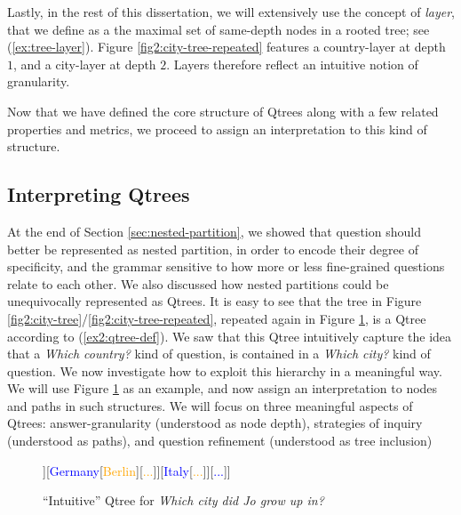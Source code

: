 Lastly, in the rest of this dissertation, we will extensively use the concept of \textit{layer}, that we define as a the maximal set of same-depth nodes in a rooted tree; see (\ref{ex:tree-layer}). Figure \ref{fig2:city-tree-repeated} features a country-layer at depth $1$, and a city-layer at depth $2$. Layers therefore reflect an intuitive notion of granularity.

\begin{exe}
	\label{ex:tree-layer}
\end{exe}


Now that we have defined the core structure of Qtrees along with a few related properties and metrics, we proceed to assign an interpretation to this kind of structure.

\subsection{Interpreting Qtrees}\label{sec:interpreting-qtrees}
At the end of Section \ref{sec:nested-partition}, we showed that question should better be represented as nested partition, in order to encode their degree of specificity, and the grammar sensitive to how more or less fine-grained questions relate to each other. We also discussed how nested partitions could be unequivocally represented as Qtrees. It is easy to see that the tree in Figure \ref{fig2:city-tree}/\ref{fig2:city-tree-repeated}, repeated again in Figure \ref{fig2:city-qtree}, is a Qtree according to (\ref{ex2:qtree-def}). We saw that this Qtree intuitively capture the idea that a \textit{Which country?} kind of question, is contained in a \textit{Which city?} kind of question. We now investigate how to exploit this hierarchy in a meaningful way. We will use Figure \ref{fig2:city-qtree} as an example, and now assign an interpretation to nodes and paths in such structures. We will focus on three meaningful aspects of Qtrees: answer-granularity (understood as node depth), strategies of inquiry (understood as paths), and question refinement (understood as tree inclusion)

\begin{figure}[H]
	\centering
	\begin{forest}
		[{CS\\
			Jo grew up in...}[\textcolor{blue}{France}[\textcolor{orange}{{Paris}}][\textcolor{orange}{Lyon}][\textcolor{orange}{...}]][\textcolor{blue}{Germany}[\textcolor{orange}{Berlin}][\textcolor{orange}{...}]][\textcolor{blue}{Italy}[\textcolor{orange}{...}]][\textcolor{blue}{...}]]
	\end{forest}
	\caption{``Intuitive'' Qtree for \textit{Which city did Jo grow up in?}}\label{fig2:city-qtree}
\end{figure}

